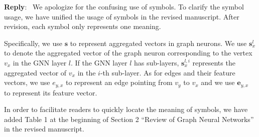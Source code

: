 \documentclass[12pt]{article}
\newcounter{reviewer}
\newcounter{point}[reviewer]
\newenvironment{reply}
   {\medskip \noindent \textbf{Reply}:\  }
   {\medskip}
\begin{document}
\begin{reply}
    We apologize for the confusing use of symbols.
    To clarify the symbol usage, we have unified the usage of symbols in the revised manuscript.
    After revision, each symbol only represents one meaning.
    
    Specifically, we use $\boldsymbol{s}$ to represent aggregated vectors in graph neurons.
    We use $\boldsymbol{s}^l_x$ to denote the aggregated vector of the graph neuron corresponding to the vertex $v_x$ in the GNN layer $l$.
    If the GNN layer $l$ has sub-layers, $\boldsymbol{s}^{l,i}_x$ represents the aggregated vector of $v_x$ in the $i$-th sub-layer.
    As for edges and their feature vectors, we use $e_{y,x}$ to represent an edge pointing from $v_y$ to $v_x$ and we use $\boldsymbol{e}_{y,x}$ to represent its feature vector.
    
    In order to facilitate readers to quickly locate the meaning of symbols, we have added Table 1 at the beginning of Section 2 ``Review of Graph Neural Networks'' in the revised manuscript.
    

\end{reply}
\end{document}
